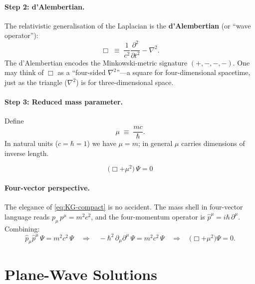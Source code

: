 \documentclass[12pt, a4paper]{article}
\theoremstyle{definition}
\begin{document}
\paragraph{Step 2: d'Alembertian.}
The relativistic generalisation of the Laplacian is the
\textbf{d'Alembertian} (or ``wave operator''):
\begin{equation}\label{eq:dAlembertian}
    \Box \;\equiv\;
    \frac{1}{c^{2}}\frac{\partial^{2}}{\partial t^{2}} - \nabla^{2}.
\end{equation}
The d'Alembertian encodes the Minkowski-metric signature $(+,-,-,-)$.  One may think of $\Box$ as a ``four-sided $\nabla^{2}$''---a square for four-dimensional spacetime, just as the triangle ($\nabla^{2}$) is for three-dimensional space.

\paragraph{Step 3: Reduced mass parameter.}
Define
\begin{equation}\label{eq:mu-def}
    \mu \;\equiv\; \frac{mc}{\hbar}.
\end{equation}
In natural units ($c=\hbar=1$) we have $\mu = m$; in general $\mu$ carries
dimensions of inverse length.

\begin{result}
\begin{equation}\label{eq:KG-compact}
    \boxed{\;
    \bigl(\Box + \mu^{2}\bigr)\,\Psi = 0
    \;}
\end{equation}
\end{result}

\paragraph{Four-vector perspective.}
The elegance of \eqref{eq:KG-compact} is no accident.  The mass shell in
four-vector language reads $p_{\mu}\,p^{\mu} = m^{2}c^{2}$, and the
four-momentum operator is $\hat{p}^{\mu} = i\hbar\,\partial^{\mu}$.
Combining:
\[
    \hat{p}_{\mu}\hat{p}^{\mu}\,\Psi = m^{2}c^{2}\,\Psi
    \quad\Longrightarrow\quad
    -\hbar^{2}\,\partial_{\mu}\partial^{\mu}\,\Psi = m^{2}c^{2}\,\Psi
    \quad\Longrightarrow\quad
    \bigl(\Box + \mu^{2}\bigr)\Psi = 0.
\]

\section{Plane-Wave Solutions}
\label{sec:solutions}
\end{document}
